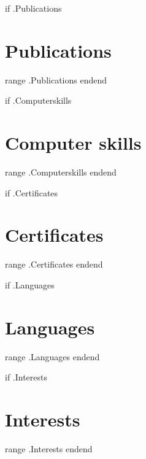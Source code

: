 \documentclass[10pt,a4paper,sans]{moderncv}
\begin{document}
{{if .Publications}}\section{Publications}
{{range .Publications}}
{{end}}{{end}}

{{if .Computerskills}}\section{Computer skills}
{{range .Computerskills}}
{{end}}{{end}}

{{if .Certificates }}\section{Certificates}
{{range .Certificates }}
{{end}}{{end}}

{{if .Languages}}\section{Languages}
{{range .Languages}}
{{end}}{{end}}

{{if .Interests}}\section{Interests}
{{range .Interests}}
{{end}}{{end}}
\end{document}
